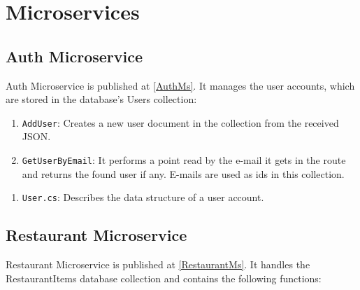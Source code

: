 \section{Microservices}

\subsection{Auth Microservice}\label{RestaurantMicroservice}

Auth Microservice is published at \ref{AuthMs}. It manages the user accounts, which are stored in the database's Users collection:

\begin{enumerate}
	\item \verb+AddUser+: Creates a new user document in the collection from the received JSON. 
	
	\item \verb+GetUserByEmail+: It performs a point read by the e-mail it gets in the route and returns the found user if any. E-mails are used as ids in this collection.
	
\end{enumerate}

\begin{enumerate}
	\item \verb+User.cs+: Describes the data structure of a user account.
\end{enumerate}

\subsection{Restaurant Microservice}\label{RestaurantMicroservice}
Restaurant Microservice is published at \ref{RestaurantMs}. It handles the RestaurantItems database collection and contains the following functions:

